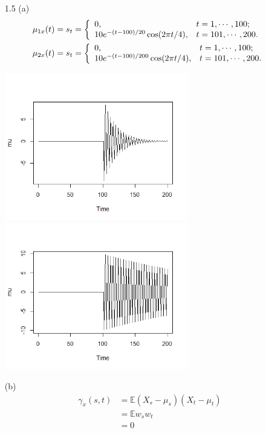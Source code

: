\documentclass{article}
\begin{document}
\begin{CJK*}{GBK}{song}
\begin{enumerate}
\item[1.5]
(a)\begin{align*}
\mu_{1x}(t)=s_t&=\left\{
                \begin{array}{ll}
                  0, & \hbox{$t=1,\cdots,100$;} \\
                  10e^{-(t-100)/20}\cos (2\pi t/4), & \hbox{$t=101,\cdots,200$.}
                \end{array}
              \right.\\
\mu_{2x}(t)=s_t&=\left\{
                \begin{array}{ll}
                  0, & \hbox{$t=1,\cdots,100$;} \\
                  10e^{-(t-100)/200}\cos (2\pi t/4), & \hbox{$t=101,\cdots,200$.}
                \end{array}
              \right.
\end{align*}
\begin{center}
\includegraphics[width=8cm]{4.png}
\includegraphics[width=8cm]{5.png}
\end{center}
(b)
\begin{align*}
\gamma_x(s,t)&=\mathbb{E}(X_s-\mu_s)(X_t-\mu_t)\\
&=\mathbb{E}w_sw_t\\
&=0
\end{align*}


\end{enumerate}
\end{CJK*}
\end{document}
